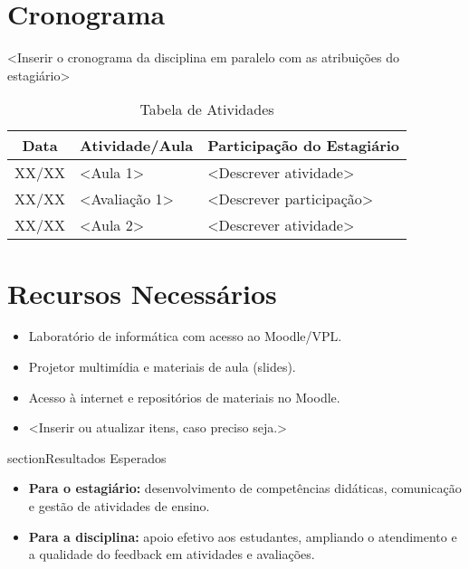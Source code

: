 \documentclass[12pt, a4paper]{article}
\begin{document}
\section{Cronograma} \label{sec:cronograma}


<Inserir o cronograma da disciplina em paralelo com as atribuições do estagiário>

\begin{table}[htbp] \centering \caption{Tabela de Atividades} \label{tab:atividades}
    \begin{tabular}{|c|l|l|} \hline
        \textbf{Data} & \textbf{Atividade/Aula} & \textbf{Participação do Estagiário} \\ \hline
        XX/XX & <Aula 1> & <Descrever atividade> \\ \hline
        XX/XX & <Avaliação 1> & <Descrever participação> \\ \hline
        XX/XX & <Aula 2> & <Descrever atividade> \\ \hline
    \end{tabular}
\end{table}


\section{Recursos Necessários} \label{sec:recursos}
\begin{itemize}
    \item Laboratório de informática com acesso ao Moodle/VPL.
    \item Projetor multimídia e materiais de aula (slides).
    \item Acesso à internet e repositórios de materiais no Moodle.
    \item <Inserir ou atualizar itens, caso preciso seja.>
\end{itemize}


section{Resultados Esperados} \label{sec:resultados}
\begin{itemize}
    \item \textbf{Para o estagiário:} desenvolvimento de competências didáticas, comunicação e gestão de atividades de ensino.
    \item \textbf{Para a disciplina:} apoio efetivo aos estudantes, ampliando o atendimento e a qualidade do feedback em atividades e avaliações.
\end{itemize}
\end{document}
